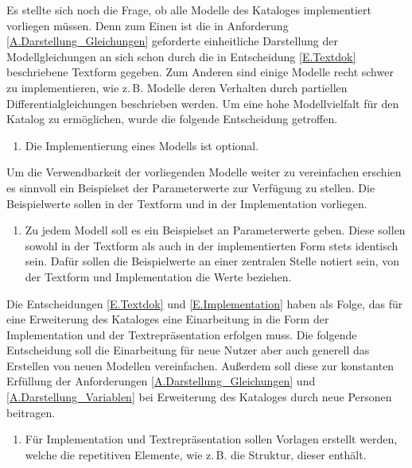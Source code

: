 Es stellte sich noch die Frage, ob alle Modelle des Kataloges implementiert vorliegen müssen. Denn zum Einen ist die in Anforderung \ref{A.Darstellung_Gleichungen} geforderte einheitliche Darstellung der Modellgleichungen an sich schon durch die in Entscheidung \ref{E.Textdok} beschriebene Textform gegeben. Zum Anderen sind einige Modelle recht schwer zu implementieren, wie z.\,B. Modelle deren Verhalten durch partiellen Differentialgleichungen beschrieben werden. Um eine hohe Modellvielfalt für den Katalog zu ermöglichen, wurde die folgende Entscheidung getroffen.
\begin{enumerate}[resume*]
	\item \label{E.ImplementierungOptional}Die Implementierung eines Modells ist optional.
\end{enumerate}

Um die Verwendbarkeit der vorliegenden Modelle weiter zu vereinfachen erschien es sinnvoll ein Beispielset der Parameterwerte zur Verfügung zu stellen. Die Beispielwerte sollen in der Textform und in der Implementation vorliegen.
\begin{enumerate}[resume*]
	\item \label{E.Parameterwerte}Zu jedem Modell soll es ein Beispielset an Parameterwerte geben. Diese sollen sowohl in der Textform als auch in der implementierten Form stets identisch sein. Dafür sollen die Beispielwerte an einer zentralen Stelle notiert sein, von der Textform und Implementation die Werte beziehen.
\end{enumerate}

Die Entscheidungen \ref{E.Textdok} und \ref{E.Implementation} haben als Folge, das für eine Erweiterung des Kataloges eine Einarbeitung in die Form der Implementation und der Textrepräsentation erfolgen muss. Die folgende Entscheidung soll die Einarbeitung für neue Nutzer aber auch generell das Erstellen von neuen Modellen vereinfachen. Außerdem soll diese zur konstanten Erfüllung der Anforderungen \ref{A.Darstellung_Gleichungen} und \ref{A.Darstellung_Variablen} bei Erweiterung des Kataloges durch neue Personen beitragen.
\begin{enumerate}[resume*]
	\item \label{E.Vorlagen}Für Implementation und Textrepräsentation sollen Vorlagen erstellt werden, welche die repetitiven Elemente, wie z.\,B. die Struktur, dieser enthält. 
\end{enumerate}

